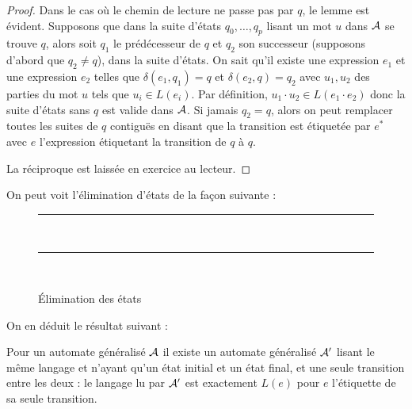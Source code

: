 \begin{proof}
    Dans le cas où le chemin de lecture ne passe pas par $q$, le lemme est évident. Supposons que dans la suite d'états $q_0,\ldots,q_p$ lisant un mot $u$ dans $\mathcal A$ se trouve $q$, alors soit $q_1$ le prédécesseur de $q$ et $q_2$ son successeur (supposons d'abord que $q_2 \neq q$), dans la suite d'états. On sait qu'il existe une expression $e_1$ et une expression $e_2$ telles que $\delta(e_1,q_1)=q$ et $\delta(e_2,q)=q_2$ avec $u_1,u_2$ des parties du mot $u$ tels que $u_i\in L(e_i)$. Par définition, $u_1\cdot u_2\in L(e_1\cdot e_2)$ donc la suite d'états sans $q$ est valide dans $\mathcal A$. Si jamais $q_2=q$, alors on peut remplacer toutes les suites de $q$ contiguës en disant que la transition est étiquetée par $e^*$ avec $e$ l'expression étiquetant la transition de $q$ à $q$.

    La réciproque est laissée en exercice au lecteur.
\end{proof}

On peut voit l'élimination d'états de la façon suivante :

\begin{figure}[htb]
    \centering
    \rule{17cm}{0.5pt}\\
    \vspace{0.5cm}
    \rule{17cm}{0.5pt}\\
    \vspace{0.5cm}
    \caption{\'Elimination des états}
\end{figure}

On en déduit le résultat suivant :

\begin{prop}\label{prop:kleene2}
    Pour un automate généralisé $\mathcal A$ il existe un automate généralisé $\mathcal A'$ lisant le même langage et n'ayant qu'un état initial et un état final, et une seule transition entre les deux : le langage lu par $\mathcal A'$ est exactement $L(e)$ pour $e$ l'étiquette de sa seule transition.
\end{prop}

